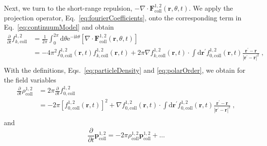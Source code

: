 \documentclass{article}
\begin{document}
Next, we turn to the short-range repulsion, $-\nabla \cdot \mathbf{F}^{1,2}_{\text{coll}}\left( \mathbf{r},\theta ,t \right)$. We apply the projection operator, Eq.~\eqref{eq:fourierCoefficients}, onto the corresponding term in Eq.~\eqref{eq:continuumModel} and obtain
\begin{equation}
    \begin{aligned}
        \frac{\partial}{\partial t}f_{k,\mathrm{coll}}^{1,2}&=\frac{1}{2\pi}\int_0^{2\pi}{\mathrm{d}\theta \mathrm{e}^{-\mathrm{i}k\theta}\left[ \nabla \cdot \mathbf{F}_{\mathrm{coll}}^{1,2}\left( \mathbf{r},\theta ,t \right) \right]}\\
        &=-4\pi ^2f_{0,\mathrm{coll}}^{1,2}\left( \mathbf{r},t \right) f_{k,\mathrm{coll}}^{1,2}\left( \mathbf{r},t \right) +2\pi \nabla f_{k,\mathrm{coll}}^{1,2}\left( \mathbf{r},t \right) \cdot \int{\mathrm{d}\mathbf{r}^{\prime}f_{0,\mathrm{coll}}^{1,2}\left( \mathbf{r},t \right) \frac{\mathbf{r}^{\prime}-\mathbf{r}}{\left| \mathbf{r}^{\prime}-\mathbf{r} \right|^2}}\;,\\
    \end{aligned}
\end{equation}
With the definitions, Eqs.~\eqref{eq:particleDensity} and \eqref{eq:polarOrder}, we obtain for the field variables
\begin{equation}
    \begin{aligned}
        \frac{\partial}{\partial t}\rho _{\mathrm{coll}}^{1,2}&=2\pi \frac{\partial}{\partial t}f_{0,\mathrm{coll}}^{1,2}\\
        &=-2\pi \left[ f_{0,\mathrm{coll}}^{1,2}\left( \mathbf{r},t \right) \right] ^2+\nabla f_{0,\mathrm{coll}}^{1,2}\left( \mathbf{r},t \right) \cdot \int{\mathrm{d}\mathbf{r}^{\prime}f_{0,\mathrm{coll}}^{1,2}\left( \mathbf{r},t \right) \frac{\mathbf{r}^{\prime}-\mathbf{r}}{\left| \mathbf{r}^{\prime}-\mathbf{r} \right|^2}}\;,\\
    \end{aligned}
\end{equation}
and
\begin{equation}
    \frac{\partial}{\partial t}\boldsymbol{p}_{\mathrm{coll}}^{1,2}=-2\pi \rho _{\mathrm{coll}}^{1,2}\boldsymbol{p}_{\mathrm{coll}}^{1,2}+\dots 
\end{equation}
\end{document}
